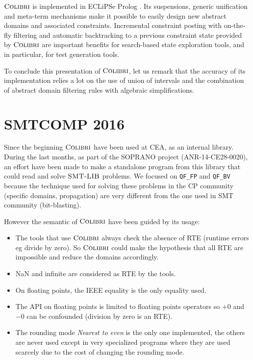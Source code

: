 \documentclass[a4paper]{article}
\newcommand{\COLIBRI}{\ensuremath{\mbox{\scshape Colibri}}\xspace}
\newcommand{\SMTLIB}{\ensuremath{\mbox{\scshape SMT-LIB}}\xspace}
\begin{document}
\COLIBRI{} is implemented in ECLiPSe Prolog \cite{Eclipse11}. Its suspensions,
generic unification and meta-term mechanisms make it possible to easily
design new abstract domains and associated constraints.
Incremental constraint posting with on-the-fly filtering
and automatic backtracking to a previous constraint state provided by \COLIBRI{}
are important benefits for
search-based state exploration tools, and in particular, for
test generation tools.

To conclude this presentation of \COLIBRI{}, let
us remark that the accuracy of its implementation relies a lot on the use of union
of intervals and the combination of abstract domain filtering rules with algebraic
simplifications.


\section{SMTCOMP 2016}

Since the beginning \COLIBRI have been used at CEA, as an internal
library. During the last months, as part of the SOPRANO project
(ANR-14-CE28-0020), an effort have been made to make a standalone
program from this library that could read and solve \SMTLIB problems.
We focused on \texttt{QF\_FP} and \texttt{QF\_BV} because the technique
used for solving these problems in the CP community (specific domains,
propagation) are very different from the one used in SMT community
(bit-blasting).

However the semantic of \COLIBRI have been guided by its usage:
\begin{itemize}
\item The tools that use \COLIBRI always check the absence of RTE
  (runtime errors eg divide by zero). So \COLIBRI
  could make the hypothesis that all RTE are impossible and reduce the
  domains accordingly.
\item NaN and infinite are considered as RTE by the tools.
\item On floating points, the IEEE equality is the only equality used.
\item The API on floating points is limited to floating points
  operators so $+0$ and $-0$ can be confounded (division by zero is an
  RTE).
\item The rounding mode \emph{Nearest to even} is the only one
  implemented, the others are never used except in very specialized
  programs where they are used scarcely due to the cost of changing
  the rounding mode.
\end{itemize}
\end{document}
